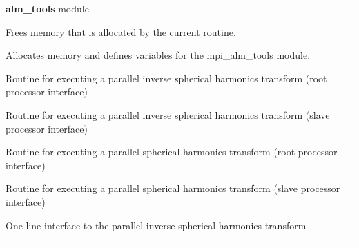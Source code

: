 \begin{modules}
  \begin{sulist}{} %
  \item[\textbf{alm\_tools}] module
  \end{sulist}
\end{modules}

\begin{related}
  \begin{sulist}{} %
   \item[\htmlref{mpi\_cleanup\_alm\_tools}{sub:mpi_cleanup_alm_tools}] Frees memory that is allocated by the current routine. 
   \item[\htmlref{mpi\_initialize\_alm\_tools}{sub:mpi_initialize_alm_tools}] Allocates memory and defines variables for the mpi\_alm\_tools module. 
  \item[\htmlref{mpi\_alm2map}{sub:mpi_alm2map}] Routine for executing a parallel inverse spherical harmonics transform (root processor interface)
  \item[\htmlref{mpi\_alm2map\_slave}{sub:mpi_alm2map_slave}] Routine for executing a parallel inverse spherical harmonics transform (slave processor interface)
  \item[\htmlref{mpi\_map2alm}{sub:mpi_map2alm}] Routine for executing a parallel spherical harmonics transform (root processor interface)
  \item[\htmlref{mpi\_map2alm\_slave}{sub:mpi_map2alm_slave}] Routine for executing a parallel spherical harmonics transform (slave processor interface)
  \item[\htmlref{mpi\_alm2map\_simple}{sub:mpi_alm2map_simple}] One-line interface to the parallel inverse spherical harmonics transform 
  \end{sulist}
\end{related}


\rule{\hsize}{2mm}

\newpage
